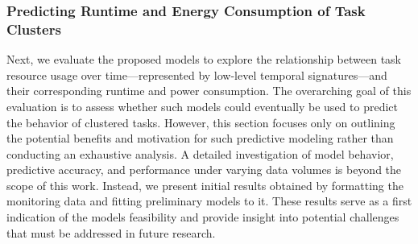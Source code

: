 \subsubsection{Predicting Runtime and Energy Consumption of Task Clusters}
\label{sec:evaluation_task_cluster_runtime_and_energy_prediction}
Next, we evaluate the proposed models to explore the relationship between task resource usage over time—represented by low-level temporal signatures—and their corresponding runtime and power consumption. The overarching goal of this evaluation is to assess whether such models could eventually be used to predict the behavior of clustered tasks. However, this section focuses only on outlining the potential benefits and motivation for such predictive modeling rather than conducting an exhaustive analysis.
A detailed investigation of model behavior, predictive accuracy, and performance under varying data volumes is beyond the scope of this work. Instead, we present initial results obtained by formatting the monitoring data and fitting preliminary models to it. These results serve as a first indication of the models feasibility and provide insight into potential challenges that must be addressed in future research.

